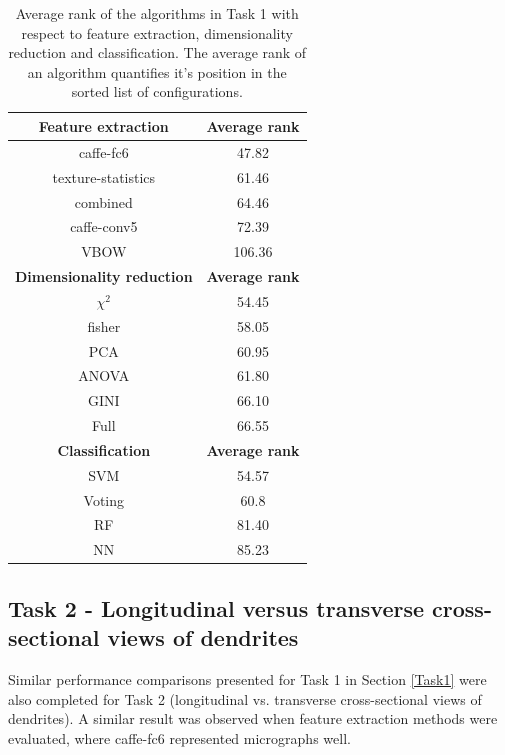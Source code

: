 \begin{table}[ht!]
\centering
\caption{Average rank of the algorithms in Task 1 with respect to feature extraction, dimensionality reduction and classification. The average rank of an algorithm quantifies it's position in the sorted list of configurations.}
\begin{tabular}{ |c|c| } 
 \hline
 \textbf{Feature extraction} & \textbf{Average rank} \\ 
 \hline
 caffe-fc6 & 47.82\\
 \hline
texture-statistics & 61.46\\
 \hline
combined& 64.46 \\
 \hline
caffe-conv5 & 72.39\\
 \hline
VBOW & 106.36\\
 \hline
 \hline
 \textbf{Dimensionality reduction} & \textbf{Average rank} \\ 
 \hline
 $\chi^2$ & 54.45\\
 \hline
fisher & 58.05\\
 \hline
PCA & 60.95 \\
 \hline
ANOVA & 61.80\\
 \hline
GINI & 66.10\\
 \hline
 Full & 66.55\\
 \hline
 \hline
 \textbf{Classification} & \textbf{Average rank} \\ 
 \hline
SVM & 54.57\\
 \hline
Voting & 60.8\\
 \hline
RF & 81.40 \\
 \hline
NN & 85.23\\
 \hline
 \end{tabular}
\label{table:average_rank1}
\end{table}

\subsection{Task 2 - Longitudinal versus transverse cross-sectional views of dendrites} 
\label{Task2}

Similar performance comparisons presented for Task 1 in Section \ref{Task1} were also completed for Task 2 (longitudinal vs. transverse cross-sectional views of dendrites).  A similar result was observed when feature extraction methods were evaluated, where caffe-fc6 represented micrographs well. 

